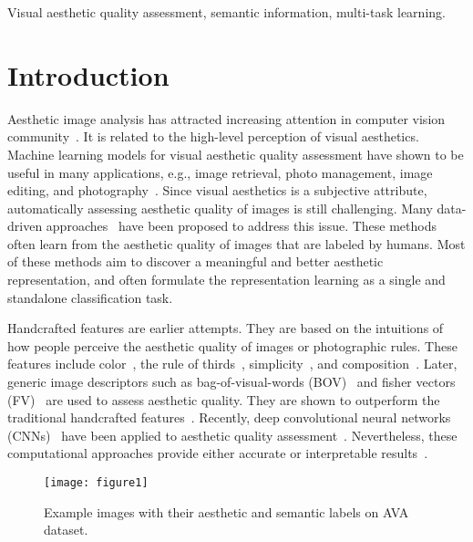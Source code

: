\documentclass[journal]{IEEEtran}
\begin{document}
\begin{IEEEkeywords}
Visual aesthetic quality assessment, semantic information, multi-task learning.
\end{IEEEkeywords}

\IEEEpeerreviewmaketitle

\section{Introduction \label{sec:intro}}
Aesthetic image analysis has attracted increasing attention in computer vision community~\cite{Datta08,Joshi13,Tang13,Marchesotti2015,Siahaan2016,Segalin2016,tarvainen2014content,park2015consensus}. It is related to the high-level perception of visual aesthetics. Machine learning models for visual aesthetic quality assessment have shown to be useful in many applications, e.g., image retrieval, photo management, image editing, and photography~\cite{Datta07,Ke06,Hong2016,zhang2014actively}. Since visual aesthetics is a subjective attribute, automatically assessing aesthetic quality of images is still challenging. Many data-driven approaches~\cite{Datta06,Luo08,Dhar11,Mar11,Yeh13,Tang13,wang13,zhang2014,wu11,zhang2014perception} have been proposed to address this issue. These methods often learn from the aesthetic quality of images that are labeled by humans. Most of these methods aim to discover a meaningful and better aesthetic representation, and often formulate the representation learning as a single and standalone classification task.

Handcrafted features are earlier attempts. They are based on the intuitions of how people perceive the aesthetic quality of images or photographic rules. These features include color~\cite{Ke06,Datta06,Nishiyama2011}, the rule of thirds~\cite{Datta06}, simplicity~\cite{Luo08,Tang13}, and composition~\cite{Dhar11}. Later, generic image descriptors such as bag-of-visual-words (BOV)~\cite{csurka2004visual} and fisher vectors (FV)~\cite{jaakkola1999exploiting} are used to assess aesthetic quality. They are shown to outperform the traditional handcrafted features~\cite{Mar11,Murray12,marchesotti2013learning}. Recently, deep convolutional neural networks (CNNs)~\cite{Krizhevsky12,Zeiler2014} have been applied to aesthetic quality assessment~\cite{lu14,kao,lu2015deep,mai2016composition}. Nevertheless, these computational approaches provide either accurate or interpretable results~\cite{Marchesotti2015}.
\begin{figure*}
  \centering
\texttt{[image: figure1]}\\
\caption{Example images with their aesthetic and semantic labels on AVA dataset.
  \label{fig:DAR1}}
\end{figure*}
\end{document}
